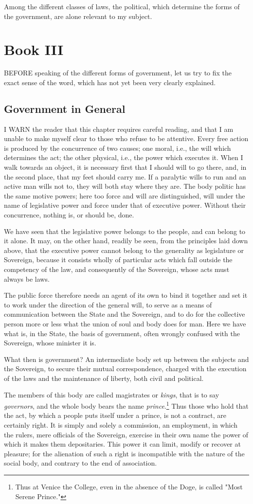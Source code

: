 \documentclass[12pt]{book}
\newcommand{\mychapter}[2]{
\setcounter{chapter}{#1}
    \setcounter{section}{0}
    \chapter*{#2}
    \addcontentsline{toc}{chapter}{#2}
}
\begin{document}
Among the different classes of laws, the political, which determine the forms of the government, are alone relevant to my subject.



\mychapter{3}{Book III}
BEFORE speaking of the different forms of government, let us try to fix the exact sense of the word, which has not yet been very clearly explained.
\section{Government in General}
I WARN the reader that this chapter requires careful reading, and that I am unable to make myself clear to those who refuse to be attentive. Every free action is produced by the concurrence of two causes; one moral, i.e., the will which determines the act; the other physical, i.e., the power which executes it. When I walk towards an object, it is necessary first that I should will to go there, and, in the second place, that my feet should carry me. If a paralytic wills to run and an active man wills not to, they will both stay where they are. The body politic has the same motive powers; here too force and will are distinguished, will under the name of legislative power and force under that of executive power. Without their concurrence, nothing is, or should be, done.

We have seen that the legislative power belongs to the people, and can belong to it alone. It may, on the other hand, readily be seen, from the principles laid down above, that the executive power cannot belong to the generality as legislature or Sovereign, because it consists wholly of particular acts which fall outside the competency of the law, and consequently of the Sovereign, whose acts must always be laws.

The public force therefore needs an agent of its own to bind it together and set it to work under the direction of the general will, to serve as a means of communication between the State and the Sovereign, and to do for the collective person more or less what the union of soul and body does for man. Here we have what is, in the State, the basis of government, often wrongly confused with the Sovereign, whose minister it is.

What then is government? An intermediate body set up between the subjects and the Sovereign, to secure their mutual correspondence, charged with the execution of the laws and the maintenance of liberty, both civil and political.

The members of this body are called magistrates or \textit{kings}, that is to say \textit{governors}, and the whole body bears the name \textit{prince}.\footnote{Thus at Venice the College, even in the absence of the Doge, is called "Most Serene Prince."} Thus those who hold that the act, by which a people puts itself under a prince, is not a contract, are certainly right. It is simply and solely a commission, an employment, in which the rulers, mere officials of the Sovereign, exercise in their own name the power of which it makes them depositaries. This power it can limit, modify or recover at pleasure; for the alienation of such a right is incompatible with the nature of the social body, and contrary to the end of association.
\end{document}
